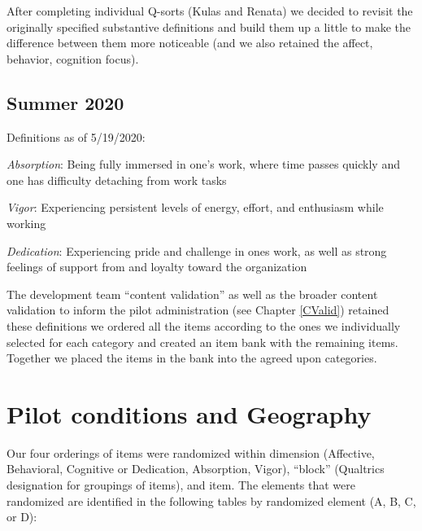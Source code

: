 \documentclass[
]{book}
\begin{document}
After completing individual Q-sorts (Kulas and Renata) we decided to revisit the originally specified substantive definitions and build them up a little to make the difference between them more noticeable (and we also retained the affect, behavior, cognition focus).

\hypertarget{summer-2020}{%
\section{Summer 2020}\label{summer-2020}}

Definitions as of 5/19/2020:

\emph{Absorption}: Being fully immersed in one's work, where time passes quickly and one has difficulty detaching from work tasks

\emph{Vigor}: Experiencing persistent levels of energy, effort, and enthusiasm while working

\emph{Dedication}: Experiencing pride and challenge in ones work, as well as strong feelings of support from and loyalty toward the organization

The development team ``content validation'' as well as the broader content validation to inform the pilot administration (see Chapter \ref{CValid}) retained these definitions we ordered all the items according to the ones we individually selected for each category and created an item bank with the remaining items. Together we placed the items in the bank into the agreed upon categories.

\hypertarget{pilot2}{%
\chapter{Pilot conditions and Geography}\label{pilot2}}

Our four orderings of items were randomized within dimension (Affective, Behavioral, Cognitive or Dedication, Absorption, Vigor), ``block'' (Qualtrics designation for groupings of items), and item. The elements that were randomized are identified in the following tables by randomized element (A, B, C, or D):
\end{document}
